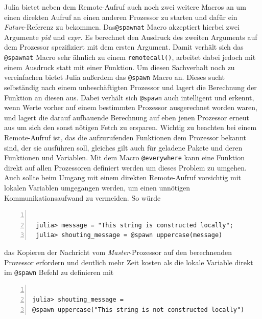 \documentclass[proseminar,german,utf8]{zihpub}
\begin{document}
Julia bietet neben dem Remote-Aufruf auch noch zwei weitere Macros an um einen direkten Aufruf an einen anderen Prozessor zu starten und dafür ein \textit{Future}-Referenz zu bekommen. Das\verb|@spawnat| Macro akzeptiert hierbei zwei Argumente \textit{pid} und \textit{expr}. Es berechnet den Ausdruck des zweiten Arguments auf dem Prozessor spezifiziert mit dem ersten Argument.  Damit verhält sich das \verb|@spawnat| Macro sehr ähnlich zu einem \verb|remotecall()|, arbeitet dabei jedoch mit einem Ausdruck statt mit einer Funktion. Um diesen Sachverhalt noch zu vereinfachen bietet Julia außerdem das \verb|@spawn| Macro an. Dieses sucht selbständig nach einem unbeschäftigten Prozessor und lagert die Berechnung der Funktion an diesen aus. Dabei verhält sich \verb|@spawn| auch intelligent und erkennt, wenn Werte vorher auf einem bestimmten Prozessor ausgerechnet worden waren, und lagert die darauf aufbauende Berechnung auf eben jenen Prozessor erneut aus um sich den sonst nötigen Fetch zu ersparen. Wichtig zu beachten bei einem Remote-Aufruf ist, das die aufzurufenden Funktionen dem Prozessor bekannt sind, der sie ausführen soll, gleiches gilt auch für geladene Pakete und deren Funktionen und Variablen. Mit dem Macro \verb|@everywhere| kann eine Funktion direkt auf allen Prozessoren definiert werden um dieses Problem zu umgehen. Auch sollte beim Umgang mit einem direkten Remote-Aufruf vorsichtig mit lokalen Variablen umgegangen werden, um einen unnötigen Kommunikationsaufwand zu vermeiden. So würde

\begin{Verbatim}[baselinestretch=1,fontsize=\scriptsize,numbers=left,frame=single,stepnumber=5,xleftmargin=1cm,xrightmargin=1cm]

 julia> message = "This string is constructed locally";
 julia> shouting_message = @spawn uppercase(message)

\end{Verbatim} 

das Kopieren der Nachricht vom \textit{Master}-Prozessor auf den berechnenden Prozessor erfordern und deutlich mehr Zeit kosten als die lokale Variable direkt im \verb|@spawn| Befehl zu definieren mit 
\begin{Verbatim}[baselinestretch=1,fontsize=\scriptsize,numbers=left,frame=single,stepnumber=5,xleftmargin=1cm,xrightmargin=1cm]

julia> shouting_message = 
@spawn uppercase("This string is not constructed locally")

\end{Verbatim}
\end{document}
